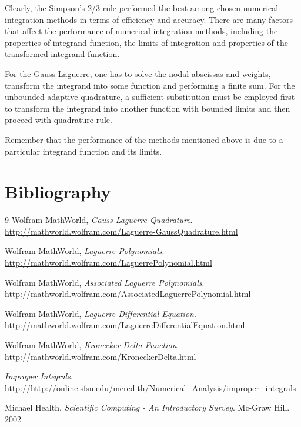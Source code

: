 \documentclass[a4paper, 11pt]{article}
\begin{document}
Clearly, the Simpson's 2/3 rule performed the best among chosen numerical integration methods in terms of efficiency and accuracy. There are many factors that affect the performance of numerical integration methods, including the properties of integrand function, the limits of integration and properties of the transformed integrand function.

For the Gauss-Laguerre, one has to solve the nodal abscissas and weights, transform the integrand into some function and performing a finite sum. For the unbounded adaptive quadrature, a sufficient substitution must be employed first to transform the integrand into another function with bounded limits and then proceed with quadrature rule.

Remember that the performance of the methods mentioned above is due to a particular integrand function and its limits.

\section{Bibliography}
\begin{thebibliography}{9}
	Wolfram MathWorld, \emph{Gauss-Laguerre Quadrature}.
	\url{http://mathworld.wolfram.com/Laguerre-GaussQuadrature.html}
	
	Wolfram MathWorld, \emph{Laguerre Polynomials}.
	\url{http://mathworld.wolfram.com/LaguerrePolynomial.html}
	
	Wolfram MathWorld, \emph{Associated Laguerre Polynomials}.
	\url{http://mathworld.wolfram.com/AssociatedLaguerrePolynomial.html}
	
	Wolfram MathWorld, \emph{Laguerre Differential Equation}.
	\url{http://mathworld.wolfram.com/LaguerreDifferentialEquation.html}
	
	Wolfram MathWorld, \emph{Kronecker Delta Function}.
	\url{http://mathworld.wolfram.com/KroneckerDelta.html}
	
	\emph{Improper Integrals}.
	\url{http://http://online.sfsu.edu/meredith/Numerical_Analysis/improper_integrals}
	
	Michael Health, \emph{Scientific Computing - An Introductory Survey}. Mc-Graw Hill. 2002
\end{thebibliography}
\end{document}

